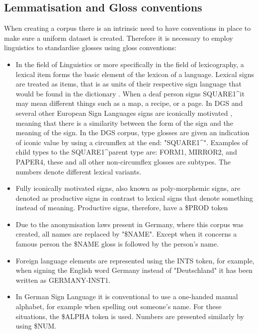\subsection{Lemmatisation and Gloss conventions}

When creating a corpus there is an intrinsic need to have conventions in place to make sure a uniform dataset is created. \cite{konradoffentliches} Therefore it is necessary to employ linguistics to standardise glosses using gloss conventions: \cite{kristoffersen2016designing}

\begin{itemize}
    \item In the field of Linguistics or more specifically in the field of lexicography, a lexical item forms the basic element of the lexicon of a language. Lexical signs are treated as items, that is as units of their respective sign language that would be found in the dictionary \cite{konradoffentliches}. When a deaf person signs SQUARE1\textasciicircum  it may mean different things such as a map, a recipe, or a page. In DGS \cite{perniss2007space} and several other European Sign Languages signs are iconically motivated \cite{pietrandrea2002iconicity} \cite{oomen2017iconicity}, meaning that there is a similarity between the form of the sign and the meaning of the sign. In the DGS corpus, type glosses are given an indication of iconic value by using a circumflex at the end: "SQUARE1\textasciicircum ". Examples of child types to the SQUARE1\textasciicircum parent type are: FORM1, MIRROR2, and PAPER4, these and all other non-circumflex glosses are subtypes. The numbers denote different lexical variants.
    \item Fully iconically motivated signs, also known as poly-morphemic signs, are denoted as productive signs in contrast to lexical signs that denote something instead of meaning. Productive signs, therefore, have a \$PROD token \cite{konradoffentliches}
    \item Due to the anonymisation laws present in Germany, where this corpus was created, all names are replaced by "\$NAME". Except when it concerns a famous person the \$NAME gloss is followed by the person's name. \cite{konradoffentliches}
    \item Foreign language elements are represented using the INTS token, for example, when signing the English word Germany instead of "Deutschland" it has been written as GERMANY-INST1.\cite{konradoffentliches}
    \item In German Sign Language it is conventional to use a one-handed manual alphabet, for example when spelling out someone's name. For these situations, the \$ALPHA token is used. Numbers are presented similarly by using \$NUM. \cite{konradoffentliches}  
\end{itemize}

